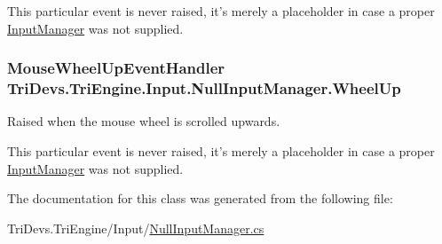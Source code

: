 This particular event is never raised, it's merely a placeholder in case a proper \hyperlink{class_tri_devs_1_1_tri_engine_1_1_input_1_1_input_manager}{Input\-Manager} was not supplied. \hypertarget{class_tri_devs_1_1_tri_engine_1_1_input_1_1_null_input_manager_a054eeda8c67b4b34dbaa9ce7a21c1fe0}{
\subsubsection[{Wheel\-Up}]{\setlength{\rightskip}{0pt plus 5cm}Mouse\-Wheel\-Up\-Event\-Handler Tri\-Devs.\-Tri\-Engine.\-Input.\-Null\-Input\-Manager.\-Wheel\-Up}}\label{class_tri_devs_1_1_tri_engine_1_1_input_1_1_null_input_manager_a054eeda8c67b4b34dbaa9ce7a21c1fe0}


Raised when the mouse wheel is scrolled upwards. 

This particular event is never raised, it's merely a placeholder in case a proper \hyperlink{class_tri_devs_1_1_tri_engine_1_1_input_1_1_input_manager}{Input\-Manager} was not supplied. 

The documentation for this class was generated from the following file\-:\begin{DoxyCompactItemize}
\item 
Tri\-Devs.\-Tri\-Engine/\-Input/\hyperlink{_null_input_manager_8cs}{Null\-Input\-Manager.\-cs}\end{DoxyCompactItemize}
